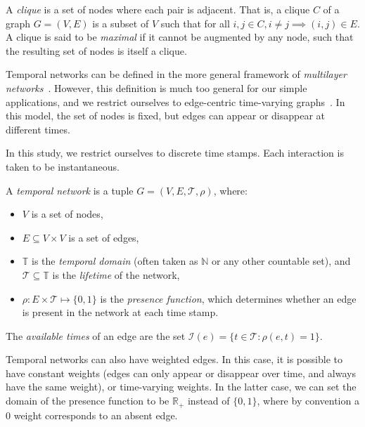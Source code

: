 \documentclass[a4paper,11pt,openany,extrafontsizes]{memoir}
\begin{document}
\begin{defn}[Clique]
  A \emph{clique} is a set of nodes where each pair is adjacent. That
  is, a clique $C$ of a graph $G = (V,E)$ is a subset of $V$ such that
  for all $i,j\in C, i \neq j \implies (i,j)\in E$. A clique is said
  to be \emph{maximal} if it cannot be augmented by any node, such
  that the resulting set of nodes is itself a clique.
\end{defn}

Temporal networks can be defined in the more general framework of
\emph{multilayer networks}~\cite{kivela_multilayer_2014}. However,
this definition is much too general for our simple applications, and
we restrict ourselves to edge-centric time-varying
graphs~\cite{casteigts_time-varying_2012}. In this model, the set of
nodes is fixed, but edges can appear or disappear at different times.

In this study, we restrict ourselves to discrete time stamps. Each
interaction is taken to be instantaneous.

\begin{defn}
  A \emph{temporal network} is a tuple
  $G = (V, E, \mathcal{T}, \rho)$, where:
  \begin{itemize}
  \item $V$ is a set of nodes,
  \item $E\subseteq V\times V$ is a set of edges,
  \item $\mathbb{T}$ is the \emph{temporal domain} (often taken as
    $\mathbb{N}$ or any other countable set), and
    $\mathcal{T}\subseteq\mathbb{T}$ is the \emph{lifetime} of the
    network,
  \item $\rho: E\times\mathcal{T}\mapsto\{0,1\}$ is the \emph{presence
      function}, which determines whether an edge is present in the
    network at each time stamp.
  \end{itemize}
  The \emph{available times} of an edge are the set
  $\mathcal{I}(e) = \{t\in\mathcal{T}: \rho(e,t)=1\}$.
\end{defn}

Temporal networks can also have weighted edges. In this case, it is
possible to have constant weights (edges can only appear or disappear
over time, and always have the same weight), or time-varying
weights. In the latter case, we can set the domain of the presence
function to be $\mathbb{R}_+$ instead of $\{0,1\}$, where by
convention a 0 weight corresponds to an absent edge.
\end{document}
